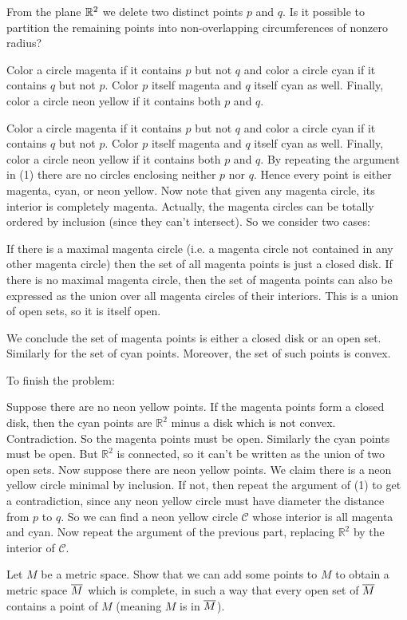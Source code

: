 \begin{problem}
	\yod
	From the plane $\mathbb R^2$ we delete two distinct points $p$ and $q$.
	Is it possible to partition the remaining points into
	non-overlapping circumferences of nonzero radius?
	\begin{hint}
		Color a circle magenta if it contains $p$ but not $q$ and color a circle cyan if it contains $q$ but not $p$. Color $p$ itself magenta and $q$ itself cyan as well. Finally, color a circle neon yellow if it contains both $p$ and $q$. 
	\end{hint}
	\begin{sol}
		Color a circle magenta if it contains $p$ but not $q$ and color a circle cyan if it contains $q$ but not $p$. Color $p$ itself magenta and $q$ itself cyan as well. Finally, color a circle neon yellow if it contains both $p$ and $q$. By repeating the argument in (1) there are no circles enclosing neither $p$ nor $q$. Hence every point is either magenta, cyan, or neon yellow.
		Now note that given any magenta circle, its interior is completely magenta. Actually, the magenta circles can be totally ordered by inclusion (since they can't intersect). So we consider two cases: 
		\begin{itemize}
		 \ii If there is a maximal magenta circle (i.e. a magenta circle not contained in any other magenta circle) then the set of all magenta points is just a closed disk.
		 \ii If there is no maximal magenta circle, then the set of magenta points can also be expressed as the union over all magenta circles of their interiors. This is a union of open sets, so it is itself open.
		 \end{itemize}

		We conclude the set of magenta points is either a closed disk or an open set. Similarly for the set of cyan points. Moreover, the set of such points is convex.

		To finish the problem:
		\begin{itemize}
		\ii Suppose there are no neon yellow points. If the magenta points form a closed disk, then the cyan points are $\mathbb R^2$ minus a disk which is not convex. Contradiction. So the magenta points must be open. Similarly the cyan points must be open. But $\mathbb R^2$ is connected, so it can't be written as the union of two open sets.
		\ii Now suppose there are neon yellow points. We claim there is a neon yellow circle minimal by inclusion. If not, then repeat the argument of (1) to get a contradiction, since any neon yellow circle must have diameter the distance from $p$ to $q$. So we can find a neon yellow circle $\mathscr C$ whose interior is all magenta and cyan. Now repeat the argument of the previous part, replacing $\mathbb R^2$ by the interior of $\mathscr C$.
		 \end{itemize}
	\end{sol}
\end{problem}

\begin{dproblem}[Completion]
	\yod
	Let $M$ be a metric space.
	Show that we can add some points to $M$ to obtain a metric space $\overline M$
	which is complete, in such a way that every open set of $\overline M$ contains
	a point of $M$ (meaning $M$ is  in $\overline M$).
\end{dproblem}
